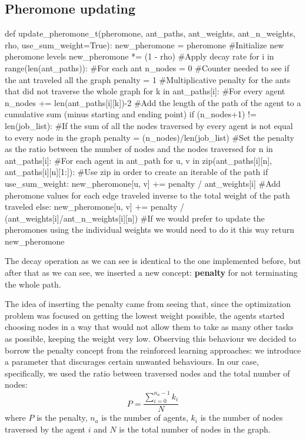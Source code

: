 \documentclass[titlepage]{article}
\begin{document}
\subsection{Pheromone updating}

\begin{python}
def update_pheromone_t(pheromone, ant_paths, ant_weights, ant_n_weights, rho, use_sum_weight=True):
    new_pheromone = pheromone #Initialize new pheromone levels
    new_pheromone *= (1 - rho) #Apply decay rate
    for i in range(len(ant_paths)): #For each ant
        n_nodes = 0 #Counter needed to see if the ant traveled all the graph
        penalty = 1 #Multiplicative penalty for the ants that did not traverse the whole graph
        for k in ant_paths[i]: #For every agent
            n_nodes += len(ant_paths[i][k])-2 #Add the length of the path of the agent to a cumulative sum (minus starting and ending point)
        if (n_nodes+1) != len(job_list): #If the sum of all the nodes traversed by every agent is not equal to every node in the graph
            penalty = (n_nodes)/len(job_list) #Set the penalty as the ratio between the number of nodes and the nodes traversed
        for n in ant_paths[i]: #For each agent in ant_path
            for u, v in zip(ant_paths[i][n], ant_paths[i][n][1:]): #Use zip in order to create an iterable of the path
                if use_sum_weight:
                    new_pheromone[u, v] += penalty / ant_weights[i] #Add pheromone values for each edge traveled inverse to the total weight of the path traveled
                else:
                    new_pheromone[u, v] += penalty / (ant_weights[i]/ant_n_weights[i][n]) #If we would prefer to update the pheromones using the individual weights we would need to do it this way
    return new_pheromone
\end{python}

The decay operation as we can see is identical to the one implemented before, but after that as we can see, we inserted a new concept: \textbf{penalty} for not terminating the whole path.

The idea of inserting the penalty came from seeing that, since the optimization problem was focused on getting the lowest weight possible, the agents started choosing nodes in a way that would not allow them to take as many other tasks as possible, keeping the weight very low. Observing this behaviour we decided to borrow the penalty concept from the reinforced learning approaches: we introduce a parameter that discurages certain unwanted behaviours. In our case, specifically, we used the ratio between traversed nodes and the total number of nodes:
\begin{equation}
    P=\frac{\sum_{i=0}^{n_a-1}k_i}{N}
\end{equation}
where $P$ is the penalty, $n_a$ is the number of agents, $k_i$ is the number of nodes traversed by the agent $i$ and $N$ is the total number of nodes in the graph.
\end{document}

